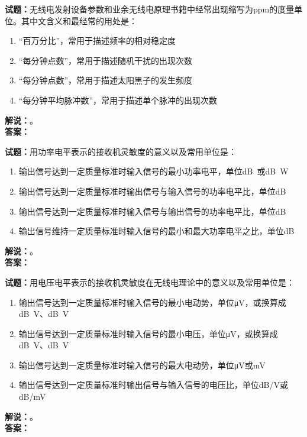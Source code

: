 \documentclass{ctexbook}
\begin{document}
\vspace{\baselineskip}

\noindent\textbf{试题：}无线电发射设备参数和业余无线电原理书籍中经常出现缩写为ppm的度量单位。其中文含义和最经常的用处是：
\begin{enumerate}[leftmargin=3em]
  \item “百万分比”，常用于描述频率的相对稳定度
  \item “每分钟点数”，常用于描述随机干扰的出现次数
  \item “每分钟点数”，常用于描述太阳黑子的发生频度
  \item “每分钟平均脉冲数”，常用于描述单个脉冲的出现次数
\end{enumerate}
\noindent\textbf{解说：}\textbf{}。\\\noindent\textbf{答案：}

\vspace{\baselineskip}

\noindent\textbf{试题：}用功率电平表示的接收机灵敏度的意义以及常用单位是：
\begin{enumerate}[leftmargin=3em]
  \item 输出信号达到一定质量标准时输入信号的最小功率电平，单位\unit[qualifier-mode=combine]{\deci\bel{}}或\unit[qualifier-mode=combine]{\deci\bel{}}W
  \item 输出信号达到一定质量标准时输出信号与输入信号的功率电平比，单位dB
  \item 输出信号达到一定质量标准时输入信号与输出信号的功率电平比，单位dB
  \item 输出信号维持一定质量标准时输入信号的最小和最大功率电平之比，单位dB
\end{enumerate}
\noindent\textbf{解说：}\textbf{}。\\\noindent\textbf{答案：}

\vspace{\baselineskip}

\noindent\textbf{试题：}用电压电平表示的接收机灵敏度在无线电理论中的意义以及常用单位是：
\begin{enumerate}[leftmargin=3em]
  \item 输出信号达到一定质量标准时输入信号的最小电动势，单位μV，或换算成\unit[qualifier-mode=combine]{\deci\bel{}}V、\unit[qualifier-mode=combine]{\deci\bel{}}V
  \item 输出信号达到一定质量标准时输入信号的最小电压，单位μV，或换算成\unit[qualifier-mode=combine]{\deci\bel{}}V、\unit[qualifier-mode=combine]{\deci\bel{}}V
  \item 输出信号达到一定质量标准时输入信号的最大电动势，单位μV或mV
  \item 输出信号达到一定质量标准时输出信号与输入信号的电压比，单位dB/V或dB/mV
\end{enumerate}
\noindent\textbf{解说：}\textbf{}。\\\noindent\textbf{答案：}
\end{document}
